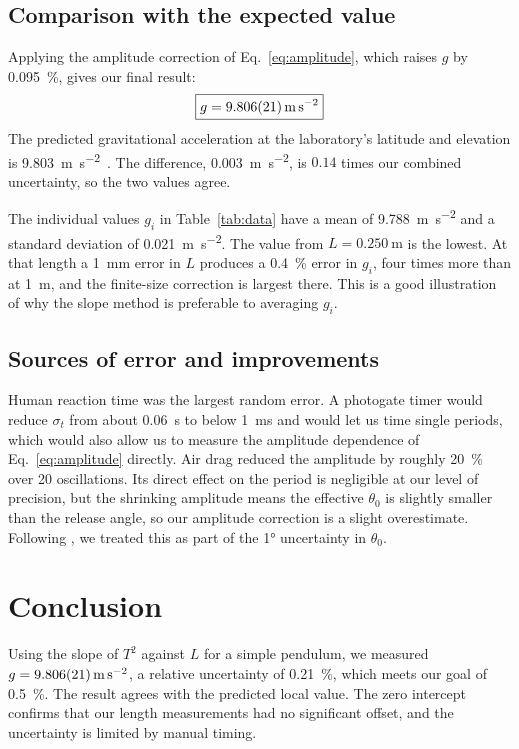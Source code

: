 \documentclass[11pt,a4paper]{article}
\begin{document}
\subsection{Comparison with the expected value}

Applying the amplitude correction of Eq.~\eqref{eq:amplitude}, which raises $g$ by \SI{0.095}{\percent}, gives our final result:
\begin{equation}
  \boxed{g = \SI{9.806 \pm 0.021}{\meter\per\second\squared}}
\end{equation}
The predicted gravitational acceleration at the laboratory's latitude and elevation is \SI{9.803}{\meter\per\second\squared}~\cite{ngs-gravity}. The difference, \SI{0.003}{\meter\per\second\squared}, is $0.14$ times our combined uncertainty, so the two values agree.

The individual values $g_i$ in Table~\ref{tab:data} have a mean of \SI{9.788}{\meter\per\second\squared} and a standard deviation of \SI{0.021}{\meter\per\second\squared}. The value from $L = \SI{0.250}{\meter}$ is the lowest. At that length a \SI{1}{\milli\meter} error in $L$ produces a \SI{0.4}{\percent} error in $g_i$, four times more than at \SI{1}{\meter}, and the finite-size correction is largest there. This is a good illustration of why the slope method is preferable to averaging $g_i$.

\subsection{Sources of error and improvements}

Human reaction time was the largest random error. A photogate timer would reduce $\sigma_t$ from about \SI{0.06}{\second} to below \SI{1}{\milli\second} and would let us time single periods, which would also allow us to measure the amplitude dependence of Eq.~\eqref{eq:amplitude} directly. Air drag reduced the amplitude by roughly \SI{20}{\percent} over 20 oscillations. Its direct effect on the period is negligible at our level of precision, but the shrinking amplitude means the effective $\theta_0$ is slightly smaller than the release angle, so our amplitude correction is a slight overestimate. Following \cite{taylor1997}, we treated this as part of the \ang{1} uncertainty in $\theta_0$.

\section{Conclusion}

Using the slope of $T^2$ against $L$ for a simple pendulum, we measured $g = \SI{9.806 \pm 0.021}{\meter\per\second\squared}$, a relative uncertainty of \SI{0.21}{\percent}, which meets our goal of \SI{0.5}{\percent}. The result agrees with the predicted local value. The zero intercept confirms that our length measurements had no significant offset, and the uncertainty is limited by manual timing.



\end{document}
